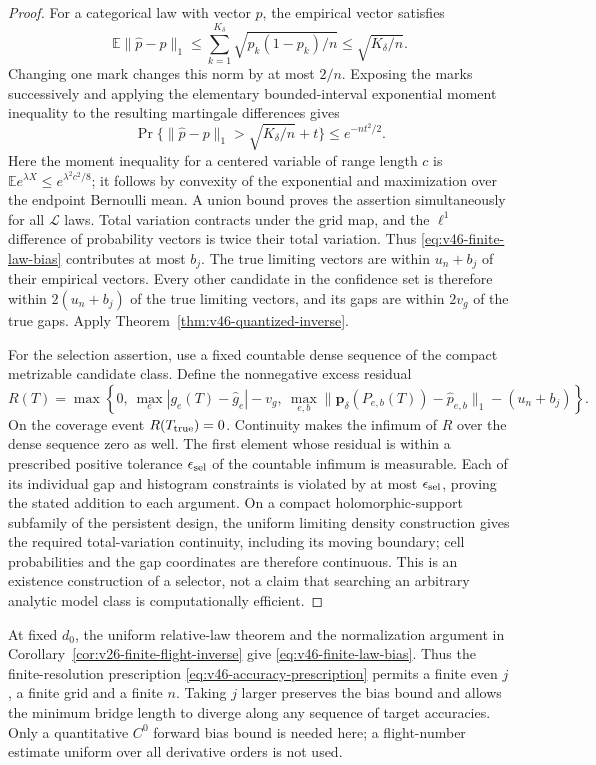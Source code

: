 \begin{proof}
For a categorical law with vector $p$, the empirical vector satisfies
\[
 \mathbb E\|\widehat p-p\|_1
 \le\sum_{k=1}^{K_\delta}\sqrt{p_k(1-p_k)/n}
 \le\sqrt{K_\delta/n}.
\]
Changing one mark changes this norm by at most $2/n$.  Exposing the marks
successively and applying the elementary bounded-interval exponential
moment inequality to the resulting martingale differences gives
\[
 \Pr\{\|\widehat p-p\|_1>
        \sqrt{K_\delta/n}+t\}\le e^{-nt^2/2}.
\]
Here the moment inequality for a centered variable of range length $c$ is
$\mathbb E e^{\lambda X}\le e^{\lambda^2c^2/8}$; it follows by convexity
of the exponential and maximization over the endpoint Bernoulli mean.
A union bound proves the assertion simultaneously for all $\mathcal L$
laws.  Total variation contracts under the grid map, and the $\ell^1$
difference of probability vectors is twice their total variation.  Thus
\eqref{eq:v46-finite-law-bias} contributes at most $b_j$.
The true limiting vectors are within $u_n+b_j$ of their empirical vectors.
Every other candidate in the confidence set is therefore within
$2(u_n+b_j)$ of the true limiting vectors, and its gaps are within $2v_g$
of the true gaps.  Apply Theorem~\ref{thm:v46-quantized-inverse}.

For the selection assertion, use a fixed countable dense sequence of the
compact metrizable candidate class.  Define the nonnegative excess residual
\[
 R(T)=\max\left\{0,\ \max_e|g_e(T)-\widehat g_e|-v_g,\
 \max_{e,b}\|\mathbf p_\delta(P_{e,b}(T))-\widehat p_{e,b}\|_1
                  -(u_n+b_j)\right\}.
\]
On the coverage event $R(T_{\rm true})=0$.  Continuity makes the infimum
of $R$ over the dense sequence zero as well.  The first element whose
residual is within a prescribed positive tolerance $\epsilon_{\rm sel}$
of the countable infimum is measurable.  Each of its individual gap and
histogram constraints is violated by at most $\epsilon_{\rm sel}$, proving
the stated addition to each argument.  On a compact holomorphic-support
subfamily of the persistent design, the uniform limiting density construction
gives the required total-variation continuity, including its moving boundary;
cell probabilities and the gap coordinates are therefore continuous.
This is an existence construction of a selector, not a claim that searching
an arbitrary analytic model class is computationally efficient.
\end{proof}

At fixed $d_0$, the uniform relative-law theorem and the normalization argument
in Corollary~\ref{cor:v26-finite-flight-inverse} give
\eqref{eq:v46-finite-law-bias}.  Thus the finite-resolution prescription
\eqref{eq:v46-accuracy-prescription} permits a finite even $j$, a finite
grid and a finite $n$.  Taking $j$ larger preserves the bias bound and allows
the minimum bridge length to diverge along any sequence of target accuracies.
Only a quantitative $C^0$ forward bias bound is needed here; a
flight-number estimate uniform over all derivative orders is not used.

